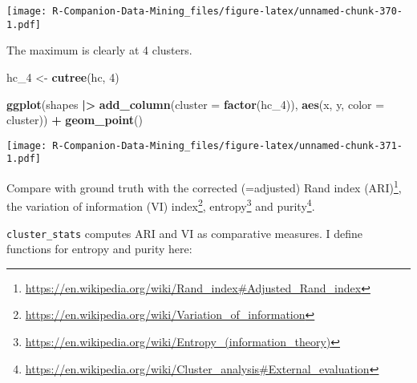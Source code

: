 \documentclass[
  notitlepage]{book}
\newenvironment{Shaded}{\begin{snugshade}}{\end{snugshade}}
\newcommand{\DataTypeTok}[1]{\textcolor[rgb]{0.13,0.29,0.53}{#1}}
\newcommand{\DecValTok}[1]{\textcolor[rgb]{0.00,0.00,0.81}{#1}}
\newcommand{\ErrorTok}[1]{\textcolor[rgb]{0.64,0.00,0.00}{\textbf{#1}}}
\newcommand{\KeywordTok}[1]{\textcolor[rgb]{0.13,0.29,0.53}{\textbf{#1}}}
\newcommand{\NormalTok}[1]{#1}
\newcommand{\OperatorTok}[1]{\textcolor[rgb]{0.81,0.36,0.00}{\textbf{#1}}}
\newcommand{\StringTok}[1]{\textcolor[rgb]{0.31,0.60,0.02}{#1}}
\DeclareRobustCommand{\href}[2]{#2\footnote{\url{#1}}}
\begin{document}
\texttt{[image: R-Companion-Data-Mining\_files/figure-latex/unnamed-chunk-370-1.pdf]}

The maximum is clearly at 4 clusters.

\begin{Shaded}
\begin{Highlighting}[]
\NormalTok{hc\_}\DecValTok{4}\NormalTok{ \textless{}{-}}\StringTok{ }\KeywordTok{cutree}\NormalTok{(hc, }\DecValTok{4}\NormalTok{)}

\KeywordTok{ggplot}\NormalTok{(shapes }\OperatorTok{|}\ErrorTok{\textgreater{}}\StringTok{ }\KeywordTok{add\_column}\NormalTok{(}\DataTypeTok{cluster =} \KeywordTok{factor}\NormalTok{(hc\_}\DecValTok{4}\NormalTok{)), }
       \KeywordTok{aes}\NormalTok{(x, y, }\DataTypeTok{color =}\NormalTok{ cluster)) }\OperatorTok{+}
\StringTok{  }\KeywordTok{geom\_point}\NormalTok{()}
\end{Highlighting}
\end{Shaded}

\texttt{[image: R-Companion-Data-Mining\_files/figure-latex/unnamed-chunk-371-1.pdf]}

Compare with ground truth with the \href{https://en.wikipedia.org/wiki/Rand_index\#Adjusted_Rand_index}{corrected (=adjusted) Rand index
(ARI)},
the \href{https://en.wikipedia.org/wiki/Variation_of_information}{variation of information (VI)
index},
\href{https://en.wikipedia.org/wiki/Entropy_(information_theory)}{entropy}
and
\href{https://en.wikipedia.org/wiki/Cluster_analysis\#External_evaluation}{purity}.

\texttt{cluster\_stats} computes ARI and VI as comparative measures. I define
functions for entropy and purity here:
\end{document}
